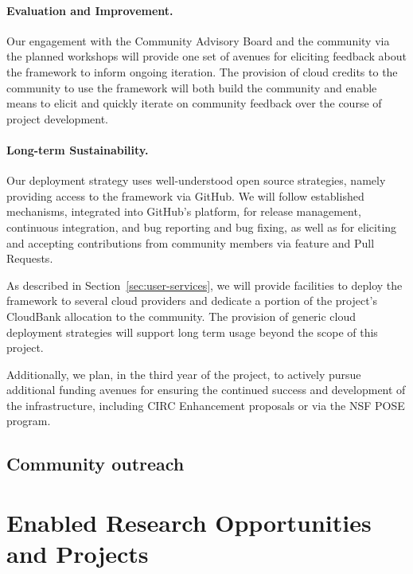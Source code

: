 \paragraph{Evaluation and Improvement.} Our engagement with the Community
Advisory Board and the community via the planned workshops will provide one set
of avenues for eliciting feedback about the framework to inform ongoing
iteration. The provision of cloud credits to the community
to use the framework will both build the community and enable means to elicit
and quickly iterate on community feedback over the course of project
development. 

\paragraph{Long-term Sustainability.} Our deployment strategy uses
well-understood open source strategies, namely providing access to the framework
via GitHub.  We will follow established mechanisms, integrated into GitHub's
platform, for release management, continuous integration, and bug reporting and
bug fixing, as well as for eliciting and accepting contributions from community
members via feature and Pull Requests. 

As described in Section~\ref{sec:user-services}, we will provide facilities to
deploy the framework to several cloud providers and dedicate a portion of the
project's CloudBank allocation to the community.  The provision of generic cloud
deployment strategies will support long term usage beyond the scope of this
project.

Additionally, we plan, in the third year of the project, to actively pursue
additional funding avenues for ensuring the continued success and development of
the infrastructure, including CIRC Enhancement proposals or via the NSF POSE
program. 

\subsection{Community outreach}



\section{Enabled Research Opportunities and Projects}

